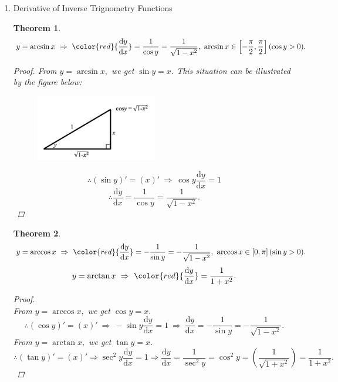 \documentclass[12pt, a4paper]{article}
\newtheorem{theorem}{Theorem}[subsection]
\newtheorem{example}{Example}[subsection]
\newtheorem{proof}{Proof}[subsection]
\begin{document}
\begin{enumerate}
\begin{example}
        $$\frac{\mathrm{d}^2y}{\mathrm{d}x^2}=\frac{-2-2\left(\frac{\mathrm{d}y}{\mathrm{d}x}\right)^2}{2y}=\frac{-2-2\left(-\frac{x}{y}\right)^2}{2y}.$$
    \end{example}
    \item Derivative of Inverse Trignometry Functions
    \begin{theorem}
        $$y=\arcsin x\ \Rightarrow\ {\color{red}{\frac{\mathrm{d}y}{\mathrm{d}x}}=\frac{1}{\cos y}=\frac{1}{\sqrt{1-x^2}}},\ \arcsin x\in\left[-\frac{\pi}{2},\frac{\pi}{2}\right](\cos y>0).$$
        \begin{proof}
            From $y=\arcsin x,$ we get $\sin y=x$. This situation can be illustrated by the figure below: 
            \begin{figure}[H]
                \centering 
                \includegraphics[width=0.5\textwidth]{Fig.5.5.jpg} 
            \end{figure}
            $$\therefore (\sin y)'=(x)'\ \Rightarrow\ \cos y\frac{\mathrm{d}y}{\mathrm{d}x}=1$$
            $$\therefore \frac{\mathrm{d}y}{\mathrm{d}x}=\frac{1}{\cos y}=\frac{1}{\sqrt{1-x^2}}.$$
        \end{proof}
    \end{theorem}
    \begin{theorem}
        $$y=\arccos x\ \Rightarrow\ {\color{red}{\frac{\mathrm{d}y}{\mathrm{d}x}}=-\frac{1}{\sin y}=-\frac{1}{\sqrt{1-x^2}}},\ \arccos x\in\left[0,\pi\right](\sin y>0).$$
        $$y=\arctan x\ \Rightarrow\ {\color{red}{\frac{\mathrm{d}y}{\mathrm{d}x}}=\frac{1}{1+x^2}}.$$
        \begin{proof}
            {\color{green}{(Hint: Try to visualize a similar diagram as in proof 4.1.)}}\\
            From $y=\arccos x,$ we get $\cos y=x$. 
            $$\therefore (\cos y)'=(x)'\ \Rightarrow\ -\sin y\frac{\mathrm{d}y}{\mathrm{d}x}=1\ \Rightarrow\ \frac{\mathrm{d}y}{\mathrm{d}x}=-\frac{1}{\sin y}=-\frac{1}{\sqrt{1-x^2}}.$$
            From $y=\arctan x,$ we get $\tan y=x$.
            $$\therefore (\tan y)'=(x)'\Rightarrow\sec^2 y\frac{\mathrm{d}y}{\mathrm{d}x}=1\Rightarrow\frac{\mathrm{d}y}{\mathrm{d}x}=\frac{1}{\sec^2 y}=\cos^2 y=\left(\frac{1}{\sqrt{1+x^2}}\right)=\frac{1}{1+x^2}.$$
        \end{proof}
    \end{theorem}
\end{enumerate}
\end{document}
